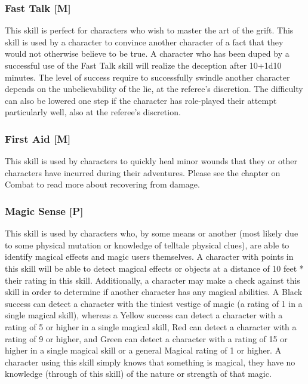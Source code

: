 \documentclass[oneside]{book}
\begin{document}
\begin{multicols}{2}
\subsubsection{Fast Talk [M]}
This skill is perfect for characters who wish to master the art of the grift. This skill is used by a character to convince another character of a fact that they would not otherwise believe to be true. A character who has been duped by a successful use of the Fast Talk skill will realize the deception after 10+1d10 minutes. The level of success require to successfully swindle another character depends on the unbelievability of the lie, at the referee's discretion. The difficulty can also be lowered one step if the character has role-played their attempt particularly well, also at the referee's discretion. 

\subsubsection{First Aid [M]}
This skill is used by characters to quickly heal minor wounds that they or other characters have incurred during their adventures. Please see the chapter on Combat to read more about recovering from damage.

\subsubsection{Magic Sense [P]}
This skill is used by characters who, by some means or another (most likely due to some physical mutation or knowledge of telltale physical clues), are able to identify magical effects and magic users themselves. A character with points in this skill will be able to detect magical effects or objects at a distance of 10 feet * their rating in this skill. Additionally, a character may make a check against this skill in order to determine if another character has any magical abilities. A Black success can detect a character with the tiniest vestige of magic (a rating of 1 in a single magical skill), whereas a Yellow success can detect a character with a rating of 5 or higher in a single magical skill, Red can detect a character with a rating of 9 or higher, and Green  can detect a character with a rating of 15 or higher in a single magical skill or a general Magical rating of 1 or higher. A character using this skill simply knows that something is magical, they have no knowledge (through of this skill) of the nature or strength of that magic. 


\end{multicols}
\end{document}
